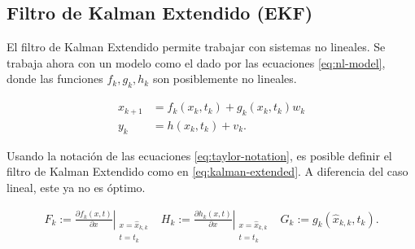 



\subsection{Filtro de Kalman Extendido (EKF)}\label{filtro-extendido}


El filtro de Kalman Extendido permite trabajar con sistemas no lineales. Se trabaja ahora con un modelo como el dado por las ecuaciones \ref{eq:nl-model}, donde las funciones \(f_k, g_k, h_k\) son posiblemente no lineales. 

\begin{equation}\label{eq:nl-model}
\begin{aligned}
x_{k+1} &= f_k(x_k, t_k) + g_k(x_k, t_k) w_k \\
y_{k} &= h(x_k, t_k) + v_k.
\end{aligned}
\end{equation}

Usando la notación de las ecuaciones \ref{eq:taylor-notation}, es posible definir el filtro de Kalman Extendido como en \ref{eq:kalman-extended}. A diferencia del caso lineal, este ya no es óptimo.

\begin{equation}\label{eq:taylor-notation}
\begin{aligned}
F_k := \left. \frac{\partial f_k(x, t)}{\partial x} \right|_{\substack{x = \hat{x}_{k,k} \\ t = t_k }} & H_k := \left. \frac{\partial h_k(x, t)}{\partial x} \right|_{\substack{x = \hat{x}_{k,k} \\ t = t_k }} & G_k := g_k(\hat{x}_{k,k}, t_k).
\end{aligned}
\end{equation}



